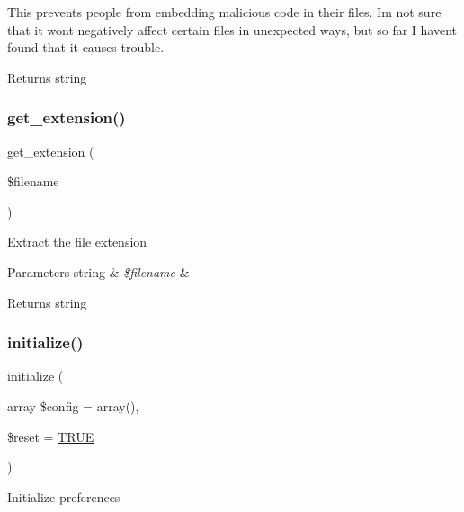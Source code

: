 This prevents people from embedding malicious code in their files. I\textquotesingle{}m not sure that it won\textquotesingle{}t negatively affect certain files in unexpected ways, but so far I haven\textquotesingle{}t found that it causes trouble.

\begin{DoxyReturn}{Returns}
string 
\end{DoxyReturn}
\mbox{\label{class_c_i___upload_a6c656eedccb1131accc8e350bc50632f}} 
\subsubsection{\texorpdfstring{get\+\_\+extension()}{get\_extension()}}
{\footnotesize\ttfamily get\+\_\+extension (\begin{DoxyParamCaption}\item[{}]{\$filename }\end{DoxyParamCaption})}

Extract the file extension


\begin{DoxyParams}[1]{Parameters}
string & {\em \$filename} & \\
\hline
\end{DoxyParams}
\begin{DoxyReturn}{Returns}
string 
\end{DoxyReturn}
\mbox{\label{class_c_i___upload_a58cef448bae0c178f3f675700b7e4413}} 
\subsubsection{\texorpdfstring{initialize()}{initialize()}}
{\footnotesize\ttfamily initialize (\begin{DoxyParamCaption}\item[{array}]{\$config = {\ttfamily array()},  }\item[{}]{\$reset = {\ttfamily \mbox{\hyperlink{constants_8php_ae04a3efe6aa42044f803ee90c2277846}{T\+R\+UE}}} }\end{DoxyParamCaption})}

Initialize preferences


